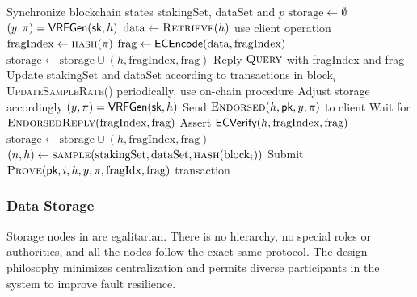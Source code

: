 \begin{algorithm}
\caption{Node routine}
\label{alg:node}
\begin{algorithmic}[1]
\State Synchronize blockchain states stakingSet, dataSet and $p$
\State $\text{storage} \gets \emptyset$
    \State $(y, \pi) = \textsf{VRFGen}(\textsf{sk}, h)$
        \State $\text{data} \gets \textsc{Retrieve}(h)$
        \Comment use client operation
        \State $\text{fragIndex} \gets \textsc{hash}(\pi)$
        \State $\text{frag} \gets \textsf{ECEncode}(\text{data}, \text{fragIndex})$
        \State $\text{storage} \gets \text{storage} \cup (h, \text{fragIndex}, \text{frag})$
    \EndIf
\EndFor
{}
            \State Reply $\textsc{Query}$ with fragIndex and frag
        \EndIf
    \EndFor
    \State Update stakingSet and dataSet according to transactions in block$_i$
    \State \textsc{UpdateSampleRate}()
    \Comment periodically, use on-chain procedure
        \State Adjust storage accordingly
    \EndIf
        \State $(y, \pi) = \textsf{VRFGen}(\textsf{sk}, h)$
            \State Send $\textsc{Endorsed}(h, \textsf{pk}, y, \pi)$ to client
            \State Wait for $\textsc{EndorsedReply}(\text{fragIndex}, \text{frag})$
            \State Assert $\textsf{ECVerify}(h, \text{fragIndex}, \text{frag})$
            \State $\text{storage} \gets \text{storage} \cup (h, \text{fragIndex}, \text{frag})$
        \EndIf
    \EndFor
    \State $(n, h) \gets \textsc{sample}(\text{stakingSet}, \text{dataSet}, \textsc{hash}(\text{block}_i))$
        \State Submit $\textsc{Prove}(\textsf{pk}, i, h, y, \pi, \text{fragIdx}, \text{frag})$ transaction
    \EndIf
\EndFor
\end{algorithmic}
\end{algorithm}

\subsubsection{Data Storage}
\label{sec:design:proto:store}
Storage nodes in \sys are egalitarian.
There is no hierarchy, no special roles or authorities, and all the nodes follow the exact same protocol.
The design philosophy minimizes centralization and permits diverse participants in the system to improve fault resilience.


